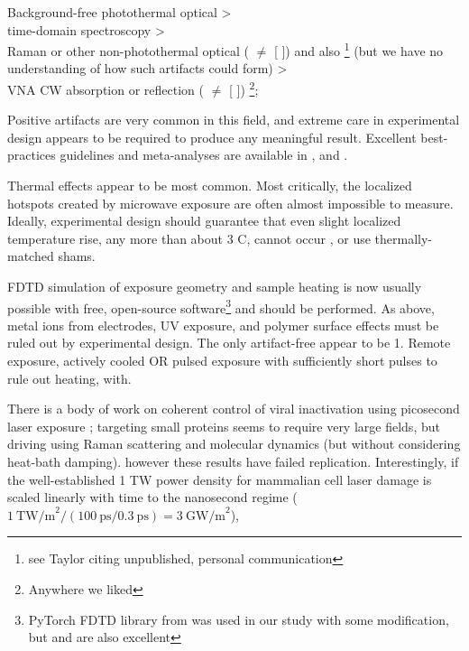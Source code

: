 \documentclass[paper.tex]{subfiles}
\begin{document}
Background-free photothermal optical \cite{Microwave1993a}\cite{Broadband1988} >\\ time-domain spectroscopy\cite{Time2003}\cite{Dielectric2004}\cite{Microwave1994} >\\ Raman or other non-photothermal optical (\cite{optical1983} $\neq$ [\cite{Resonances1987} \cite{Dielectric1989}]) and also \footnote{see Taylor \cite{mechanisms1981} citing unpublished, personal communication} (but we have no understanding of how such artifacts could form) >\\ VNA CW absorption or reflection (\cite{Microwave1982} $\neq$ [\cite{Resonances1987} \cite{Dielectric1989}]) \cite{Substitution1982} \cite{Millimeter1980} \footnote{Anywhere we liked};

Positive artifacts are very common in this field, and extreme care in experimental design appears to be required to produce any meaningful result. Excellent best-practices guidelines and meta-analyses are available in \cite{Biological2016} \cite{Comprehensive2018} \cite{Funding2019}, \cite{chou1996radio} and \cite{Effects2016}.

Thermal effects appear to be most common. Most critically, the localized hotspots created by microwave exposure are often almost impossible to measure. Ideally, experimental design should guarantee that even slight localized temperature rise, any more than about 3 C, cannot occur \cite{Sharp1983}\cite{DNA2004}, or use thermally-matched shams\cite{Basic1983}. \cite{Effects1951}

FDTD simulation of exposure geometry and sample heating is now usually possible with free, open-source software\footnote{PyTorch FDTD library from \cite{Highly2019} was used in our study with some modification, but \cite{CUDAbased2019} and \cite{openEMS} are also excellent} and should be performed. As above, metal ions from electrodes, UV exposure, and polymer surface effects\cite{Effect1994a} must be ruled out by experimental design. The only artifact-free appear to be 1. Remote exposure, actively cooled OR pulsed exposure with sufficiently short pulses to rule out heating, with. 

 There is a body of work on coherent control of viral inactivation using picosecond laser exposure \cite{Maximum2010}; targeting small proteins seems to require very large fields\cite{Picosecond2016b}, but driving using Raman scattering \cite{Inactivation2007} \cite{Prospects2012}\cite{Studies2014} and molecular dynamics \cite{Maximum2010} (but without considering heat-bath damping). however these results have failed replication\cite{No2011}. Interestingly, if the well-established 1 TW power density\cite{Targeted2002} for mammalian cell laser damage is scaled linearly with time to the nanosecond regime ($1\ \text{TW/m}^2 / (100\ \text{ps} / 0.3\ \text{ps}) = 3\ \text{GW/m}^2$), 
\end{document}

